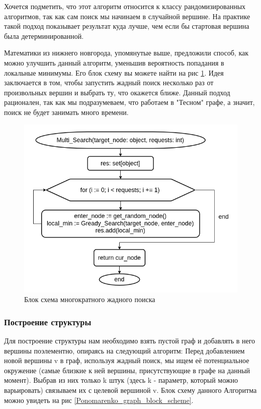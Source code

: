 Хочется подметить, что этот алгоритм относится к классу рандомизированных алгоритмов,
так как сам поиск мы начинаем в случайной вершине. На практике такой подход показывает
результат куда лучше, чем если бы стартовая вершина была детерминированной.


Математики из нижнего новгорода, упомянутые выше, предложили способ, как можно улучшить
данный алгоритм, уменьшив вероятность попадания в локальные минимумы. Его блок схему
вы можете найти на рис \ref{multi_search_block_scheme}. Идея заключается в том, чтобы
запустить жадный поиск несколько раз от произвольных вершин и выбрать ту, что окажется ближе.
Данный подход рационален, так как мы подразумеваем, что работаем в "Тесном" графе, а значит,
поиск не будет занимать много времени.

\begin{figure}[H]
    \centering
    \includegraphics[scale=0.6]{./pictures/Multi_Search.png}
    \caption{Блок схема многократного жадного поиска} \label{multi_search_block_scheme}
\end{figure}

\subsubsection{Построение структуры}

Для построение структуры нам необходимо взять пустой граф и добавлять в него вершины
поэлементно, опираясь на следующий алгоритм: Перед добавлением новой вершины v в граф, 
используя жадный поиск, мы ищем её потенциальное окружение (самые близкие к ней вершины,
присутствующие в графе на данный момент). Выбрав из них только k штук (здесь k - параметр, который
можно варьировать) связываем их с целевой вершиной v. Блок схему данного Алгоритма можно
увидеть на рис \ref{Ponomarenko_graph_block_scheme}.

